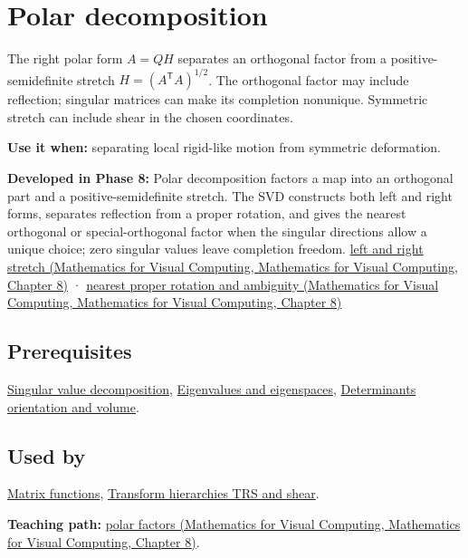 \hypertarget{appendix-73f5bcf7a462}{}\label{referencestart:appendix-73f5bcf7a462}
\section{Polar decomposition}\label{appendix-73f5bcf7a462-polar-decomposition}

The right polar form \(A=QH\) separates an orthogonal factor from a positive-semidefinite stretch \(H=(A^\mathsf T A)^{1/2}\). The orthogonal factor may include reflection; singular matrices can make its completion nonunique. Symmetric stretch can include shear in the chosen coordinates.

\textbf{Use it when:} separating local rigid-like motion from symmetric deformation.

\textbf{Developed in Phase 8:} Polar decomposition factors a map into an orthogonal part and a positive-semidefinite stretch. The SVD constructs both left and right forms, separates reflection from a proper rotation, and gives the nearest orthogonal or special-orthogonal factor when the singular directions allow a unique choice; zero singular values leave completion freedom. \href{../02-Mathematics-for-Visual-Computing/main.pdf\#nameddest=02-foundations-ii-ch024-polar-decomposition-separates-frame-dependent-stretch-from-orientation}{left and right stretch (Mathematics for Visual Computing, Mathematics for Visual Computing, Chapter 8)} · \href{../02-Mathematics-for-Visual-Computing/main.pdf\#nameddest=02-foundations-ii-ch024-two-sided-rotations-nearest-proper-rotation-and-nonunique-directions}{nearest proper rotation and ambiguity (Mathematics for Visual Computing, Mathematics for Visual Computing, Chapter 8)}

\subsection{Prerequisites}\label{appendix-73f5bcf7a462-prerequisites}

\hyperref[appendix-1fad5e7f36fa]{Singular value decomposition}, \hyperref[appendix-0b3be18411f9]{Eigenvalues and eigenspaces}, \hyperref[appendix-da478be01d02]{Determinants orientation and volume}.

\subsection{Used by}\label{appendix-73f5bcf7a462-used-by}

\hyperref[appendix-0f4bc2bf2b1f]{Matrix functions}, \hyperref[appendix-292c061cd47c]{Transform hierarchies TRS and shear}.

\textbf{Teaching path:} \href{../02-Mathematics-for-Visual-Computing/main.pdf\#nameddest=02-foundations-ii-ch024-polar-decomposition-separates-rotation-like-motion-from-stretch}{polar factors (Mathematics for Visual Computing, Mathematics for Visual Computing, Chapter 8)}.
